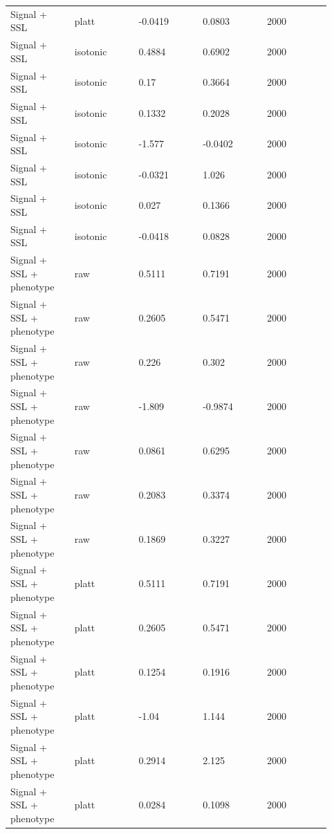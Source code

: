 \documentclass[utf8]{frontiers_suppmat}
\begin{document}
\begin{landscape}
\begin{longtable}{L{0.184\linewidth} L{0.184\linewidth} L{0.184\linewidth} L{0.184\linewidth} L{0.184\linewidth}}
Signal + SSL & platt & -\allowbreak{}0.\allowbreak{}0419 & 0.\allowbreak{}0803 & 2000 \\
Signal + SSL & isotonic & 0.\allowbreak{}4884 & 0.\allowbreak{}6902 & 2000 \\
Signal + SSL & isotonic & 0.\allowbreak{}17 & 0.\allowbreak{}3664 & 2000 \\
Signal + SSL & isotonic & 0.\allowbreak{}1332 & 0.\allowbreak{}2028 & 2000 \\
Signal + SSL & isotonic & -\allowbreak{}1.\allowbreak{}577 & -\allowbreak{}0.\allowbreak{}0402 & 2000 \\
Signal + SSL & isotonic & -\allowbreak{}0.\allowbreak{}0321 & 1.\allowbreak{}026 & 2000 \\
Signal + SSL & isotonic & 0.\allowbreak{}027 & 0.\allowbreak{}1366 & 2000 \\
Signal + SSL & isotonic & -\allowbreak{}0.\allowbreak{}0418 & 0.\allowbreak{}0828 & 2000 \\
Signal + SSL + phenotype & raw & 0.\allowbreak{}5111 & 0.\allowbreak{}7191 & 2000 \\
Signal + SSL + phenotype & raw & 0.\allowbreak{}2605 & 0.\allowbreak{}5471 & 2000 \\
Signal + SSL + phenotype & raw & 0.\allowbreak{}226 & 0.\allowbreak{}302 & 2000 \\
Signal + SSL + phenotype & raw & -\allowbreak{}1.\allowbreak{}809 & -\allowbreak{}0.\allowbreak{}9874 & 2000 \\
Signal + SSL + phenotype & raw & 0.\allowbreak{}0861 & 0.\allowbreak{}6295 & 2000 \\
Signal + SSL + phenotype & raw & 0.\allowbreak{}2083 & 0.\allowbreak{}3374 & 2000 \\
Signal + SSL + phenotype & raw & 0.\allowbreak{}1869 & 0.\allowbreak{}3227 & 2000 \\
Signal + SSL + phenotype & platt & 0.\allowbreak{}5111 & 0.\allowbreak{}7191 & 2000 \\
Signal + SSL + phenotype & platt & 0.\allowbreak{}2605 & 0.\allowbreak{}5471 & 2000 \\
Signal + SSL + phenotype & platt & 0.\allowbreak{}1254 & 0.\allowbreak{}1916 & 2000 \\
Signal + SSL + phenotype & platt & -\allowbreak{}1.\allowbreak{}04 & 1.\allowbreak{}144 & 2000 \\
Signal + SSL + phenotype & platt & 0.\allowbreak{}2914 & 2.\allowbreak{}125 & 2000 \\
Signal + SSL + phenotype & platt & 0.\allowbreak{}0284 & 0.\allowbreak{}1098 & 2000 \\

\end{longtable}
\end{landscape}
\end{document}
